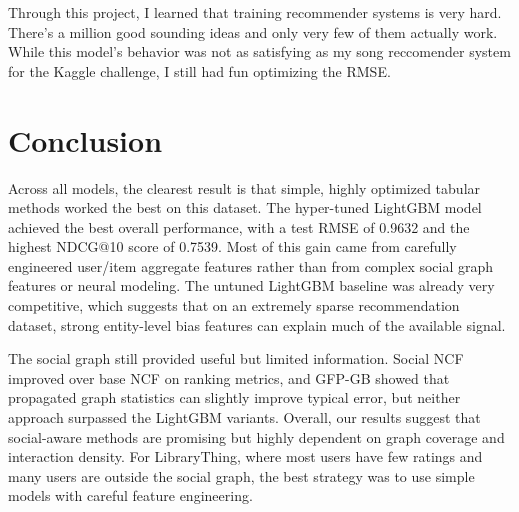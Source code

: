 \documentclass[conference]{IEEEtran}
\begin{document}
Through this project, I learned that training recommender systems is very hard. There's a million good sounding ideas and only very few of them actually work. While this model's behavior was not as satisfying as my song reccomender system for the Kaggle challenge, I still had fun optimizing the RMSE.

\section{Conclusion}
\label{sec:conclusion}

Across all models, the clearest result is that simple, highly optimized tabular
methods worked the best on this dataset. The hyper-tuned LightGBM model
achieved the best overall performance, with a test RMSE of 0.9632 and the
highest NDCG@10 score of 0.7539. Most of this gain came from carefully
engineered user/item aggregate features rather than from complex social graph features or
neural modeling. The untuned LightGBM baseline was already very competitive,
which suggests that on an extremely sparse recommendation dataset, strong
entity-level bias features can explain much of the available signal.

The social graph still provided useful but limited information. Social NCF
improved over base NCF on ranking metrics, and GFP-GB showed that propagated
graph statistics can slightly improve typical error, but neither approach
surpassed the LightGBM variants. Overall, our results suggest that social-aware
methods are promising but highly dependent on graph coverage and interaction
density. For LibraryThing, where most users have few ratings and many users are
outside the social graph, the best strategy was to use simple models with
careful feature engineering.



\end{document}
